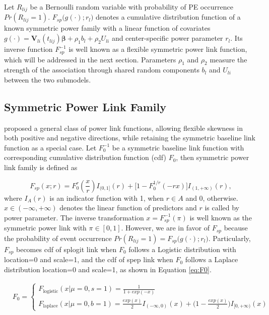 Let $R_{lij}$ be a Bernoulli random variable with probability of PE occurrence $Pr(R_{lij}=1)$. $F_{sp}\big(g(\cdot); r_l\big)$ denotes a cumulative distribution function of a known symmetric power family with a linear function of covariates $g(\cdot)=\bm{V}_{li}(t_{lij})\bm{\beta}+\rho_1 b_l + \rho_2 U_{li}$ and center-specific power parameter $r_l$. Its inverse function $F^{-1}_{sp}$ is well known as a flexible symmetric power link function, which will be addressed in the next section. Parameters $\rho_1$ and $\rho_2$ measure the strength of the association through shared random components $b_l$ and $U_{li}$ between the two submodels.

\subsection{Symmetric Power Link Family}

\cite{Jiang2013} proposed a general class of power link functions, allowing flexible skewness in both positive and negative directions, while retaining the symmetric baseline link function as a special case. Let $F^{-1}_0$ be a symmetric baseline link function with corresponding cumulative distribution function (cdf) $F_0$, then symmetric power link family is defined as

\begin{equation} \label{eq:ch2_Fsp}
  F_{sp}(x;r)=F_0^r(\frac{x}{r})I_{(0,1]}(r)+\big[1-F^{1/r}_0(-rx)\big]I_{(1,+\infty)}(r),    
\end{equation}
where $I_A(r)$ is an indicator function with 1, when $r \in A$ and 0, otherwise. $x \in (-\infty, +\infty)$ denotes the linear function of predictors and $r$ is called by power parameter. The inverse transformation $x=F^{-1}_{sp}(\pi)$ is well known as the symmetric power link with $\pi \in [0,1]$. However, we are in favor of $F_{sp}$ because the probability of event occurrence $Pr(R_{lij}=1)=F_{sp}\big(g(\cdot);r_l\big)$. Particularly, $F_{sp}$ becomes cdf of splogit link when $F_0$ follows a Logistic distribution with location=0 and scale=1, and the cdf of spep link when $F_0$ follows a Laplace distribution location=0 and scale=1, as shown in Equation \ref{eq:F0}. 

\begin{align}
& F_0= \left \{\begin{array}{ll}
  F_{\mbox{logistic}}(x|\mu=0, s=1)= \frac{1}{1+exp(-x)}\\
  F_{\mbox{laplace}}(x|\mu=0, b=1)=\frac{exp(x)}{2}I_{(-\infty,0)}(x)+\big(1-\frac{exp(x)}{2}\big)I_{[0, +\infty)}(x)
\end{array}\right.
\label{eq:F0}
\end{align}

